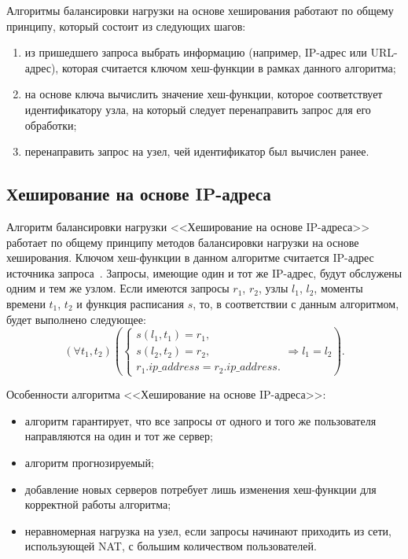 Алгоритмы балансировки нагрузки на основе хеширования работают по общему принципу, который состоит из следующих шагов:
\begin{enumerate}
	\item из пришедшего запроса выбрать информацию (например, IP-адрес или URL-адрес), которая считается ключом хеш-функции в рамках данного алгоритма;
	\item на основе ключа вычислить значение хеш-функции, которое соответствует идентификатору узла, на который следует перенаправить запрос для его обработки;
	\item перенаправить запрос на узел, чей идентификатор был вычислен ранее.
\end{enumerate}

\subsection*{Хеширование на основе IP-адреса}

Алгоритм балансировки нагрузки <<Хеширование на основе IP-адреса>> работает по общему принципу методов балансировки нагрузки на основе хеширования.
Ключом хеш-функции в данном алгоритме считается IP-адрес источника запроса~\cite{nginx, aws, kemp}.
Запросы, имеющие один и тот же IP-адрес, будут обслужены одним и тем же узлом.
Если имеются запросы $r_1$, $r_2$, узлы $l_1$, $l_2$, моменты времени $t_1$, $t_2$ и функция расписания $s$, то, в соответствии с данным алгоритмом, будет выполнено следующее:
\begin{equation}
	(\forall t_1, t_2) \left(\begin{cases}
		s(l_1, t_1) = r_1, \\
		s(l_2, t_2) = r_2, \\
		r_1.ip\_address = r_2.ip\_address.
	\end{cases} \Rightarrow l_1 = l_2 \right).
\end{equation}

Особенности алгоритма <<Хеширование на основе IP-адреса>>:
\begin{itemize}
	\item алгоритм гарантирует, что все запросы от одного и того же пользователя направляются на один и тот же сервер;
	\item алгоритм прогнозируемый; 
	\item добавление новых серверов потребует лишь изменения хеш-функции для корректной работы алгоритма;
	\item неравномерная нагрузка на узел, если запросы начинают приходить из сети, использующей NAT, с большим количеством пользователей.
\end{itemize}

